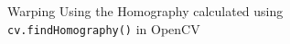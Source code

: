 \documentclass[a4paper,11pt]{article}%
\begin{document}
\begin{figure}[!h]
	\centering
	\caption{Warping Using the Homography calculated using {\tt cv.findHomography()} in OpenCV }
	\label{findhomo}
\end{figure}  
\end{document}
